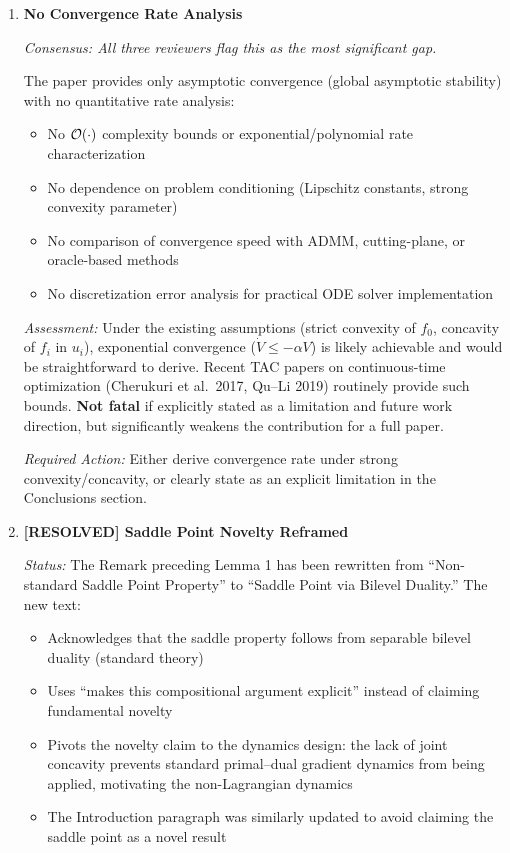 \documentclass[journal,twoside,web]{ieeecolor}
\begin{document}
\begin{enumerate}

\item \textbf{No Convergence Rate Analysis}

\textit{Consensus: All three reviewers flag this as the most significant gap.}

The paper provides only asymptotic convergence (global asymptotic stability) with no quantitative rate analysis:
\begin{itemize}
\item No ${\cal O}(\cdot)$ complexity bounds or exponential/polynomial rate characterization
\item No dependence on problem conditioning (Lipschitz constants, strong convexity parameter)
\item No comparison of convergence speed with ADMM, cutting-plane, or oracle-based methods
\item No discretization error analysis for practical ODE solver implementation
\end{itemize}

\textit{Assessment:} Under the existing assumptions (strict convexity of $f_0$, concavity of $f_i$ in $u_i$), exponential convergence ($\dot{V} \leq -\alpha V$) is likely achievable and would be straightforward to derive. Recent TAC papers on continuous-time optimization (Cherukuri et al.\ 2017, Qu--Li 2019) routinely provide such bounds. \textbf{Not fatal} if explicitly stated as a limitation and future work direction, but significantly weakens the contribution for a full paper.

\textit{Required Action:} Either derive convergence rate under strong convexity/concavity, or clearly state as an explicit limitation in the Conclusions section.

\item \textbf{{\color{ForestGreen}[RESOLVED]} Saddle Point Novelty Reframed}

\textit{Status:} The Remark preceding Lemma 1 has been rewritten from ``Non-standard Saddle Point Property'' to ``Saddle Point via Bilevel Duality.'' The new text:
\begin{itemize}
\item Acknowledges that the saddle property follows from separable bilevel duality (standard theory)
\item Uses ``makes this compositional argument explicit'' instead of claiming fundamental novelty
\item Pivots the novelty claim to the dynamics design: the lack of joint concavity prevents standard primal--dual gradient dynamics \cite{arrow1958,feijer2010,cherukuri2016} from being applied, motivating the non-Lagrangian dynamics
\item The Introduction paragraph was similarly updated to avoid claiming the saddle point as a novel result
\end{itemize}


\end{enumerate}
\end{document}
